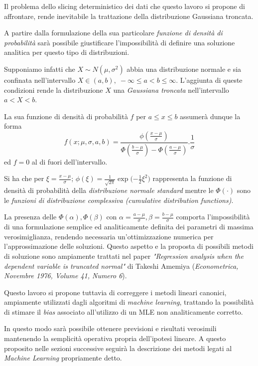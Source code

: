 \documentclass[a4paper]{report}
\begin{document}
Il problema dello slicing deterministico dei dati che questo lavoro si propone di affrontare, rende inevitabile la trattazione della distribuzione Gaussiana troncata.

A partire dalla formulazione della sua particolare \textit{funzione di densità di probabilità} sarà possibile giustificare l'impossibilità di definire una soluzione analitica per questo tipo di distribuzioni.

Supponiamo infatti che  $X \sim N(\mu, \sigma^{2}) \!$ abbia una distribuzione normale e sia confinata nell'intervallo $ X \in (a,b), \; -\infty \leq a < b \leq \infty $. 
L'aggiunta di queste  condizioni rende la distribuzione $X$ una \textit{Gaussiana troncata} nell'intervallo
$a<X<b$.

La sua funzione di densità di probabilità $f$ per $a\leq x \leq b$ assumerà dunque la forma
\[
f(x;\mu,\sigma,a,b) = \frac{\phi(\frac{x - \mu}{\sigma})}{\Phi(\frac{b - \mu}{\sigma}) - \Phi(\frac{a - \mu}{\sigma}) }{.}\frac{1}{\sigma}
\]
ed $f=0$ al di fuori dell'intervallo.

Si ha che per $	\xi=\frac{x-\mu}{\sigma}$; ${\phi(\xi)=\frac{1}{\sqrt{2 \pi}}\exp{(-\frac{1}{2}\xi^2})} $ rappresenta la funzione di densità di probabilità della \textit{distribuzione normale standard} mentre le ${\Phi(\cdot)}$ sono le \textit{funzioni di distribuzione complessiva (cumulative distribution functions)}.

La presenza delle $\Phi(\alpha),\Phi(\beta)$ con $\alpha=\frac{a-\mu}{\sigma}, \beta=\frac{b-\mu} {\sigma}$ comporta l'impossibilità di una formulazione semplice ed analiticamente definita dei parametri di massima verosimiglianza, rendendo necessaria un'ottimizzazione numerica per l'approssimazione delle soluzioni.
Questo aspetto e la proposta di possibili metodi di soluzione sono ampiamente trattati nel paper \textit{"Regression analysis when the dependent variable is truncated normal"} di Takeshi Amemiya (\textit{Econometrica, Novembre 1976, Volume 41, Numero 6}).

Questo lavoro si propone tuttavia di correggere i metodi lineari canonici, ampiamente utilizzati dagli algoritmi di \textit{machine learning}, trattando la possibilità di stimare il \textit{bias} associato all'utilizzo di un MLE non analiticamente corretto. 

In questo modo sarà possibile ottenere previsioni e risultati verosimili mantenendo la semplicità operativa propria dell'ipotesi lineare.
A questo proposito nelle sezioni successive seguirà la descrizione dei metodi legati al \textit{Machine Learning} propriamente detto.
\end{document}

